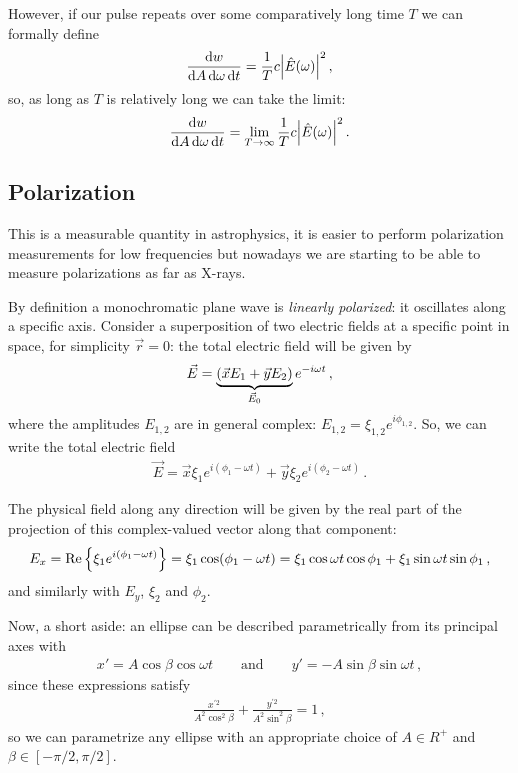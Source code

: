 \documentclass[main.tex]{subfiles}
\begin{document}
However, if our pulse repeats over some comparatively long time \(T\) we can formally define 
%
\begin{align}
\frac{ \dd{w}}{ \dd{A} \dd{\omega } \dd{t}} = \frac{1}{T} c \abs{\hat{E}(\omega )}^2
\,,
\end{align}
%
so, as long as \(T\) is relatively long we can take the limit:
%
\begin{align}
\frac{ \dd{w}}{ \dd{A} \dd{\omega } \dd{t}} = \lim_{T \to \infty  } \frac{1}{T} c \abs{\hat{E}(\omega )}^2
\,.
\end{align}

\subsection{Polarization}

This is a measurable quantity in astrophysics, it is easier to perform polarization measurements for low frequencies but nowadays we are starting to be able to measure polarizations as far as X-rays. 

By definition a monochromatic plane wave is \emph{linearly polarized}: it oscillates along a specific axis. 
Consider a superposition of two electric fields at a specific point in space, for simplicity \(\vec{r} = 0 \): the total electric field will be given by 
%
\begin{align}
\vec{E} = \underbrace{\qty(\vec{x} E_1 + \vec{y} E_2 )}_{\vec{E}_0 } e^{-i \omega t}
\,,
\end{align}
%
where the amplitudes \(E_{1,2} \) are in general complex: \(E_{1, 2} = \xi_{1, 2} e^{i \phi_{1,2} }\). So, we can write the total electric field 
%
\begin{align}
\vec{E} = 
\vec{x} \xi_1 e^{i (\phi_1 - \omega t)}
+
\vec{y} \xi_2 e^{i (\phi_2 - \omega t)}
\,.
\end{align}

The physical field along any direction will be given by the real part of the projection of this complex-valued vector along that component: 
%
\begin{align}
E_x = \Re \qty{\xi_1 e^{i (\phi_1 - \omega t)}} = \xi_1 \cos(\phi_1 - \omega t)
= \xi_1 \cos \omega t  \cos \phi_1 + \xi_1 \sin \omega t \sin \phi_1 
\,,
\end{align}
%
and similarly with \(E_y\), \(\xi_2\) and \(\phi_2 \). 

Now, a short aside: an ellipse can be described parametrically from its principal axes with 
%
\begin{align}
x' = A \cos \beta \cos \omega t
\qquad \text{and} \qquad
y' = - A \sin \beta \sin \omega t
\,,
\end{align}
%
since these expressions satisfy 
%
\begin{align}
\frac{x^{\prime 2} }{A^2 \cos^2\beta }
+\frac{y^{\prime 2} }{A^2 \sin^2\beta }
= 1
\,,
\end{align}
%
so we can parametrize any ellipse with an appropriate choice of \(A \in R^{+}\) and \(\beta \in [- \pi /2, \pi /2]\). 
\end{document}
